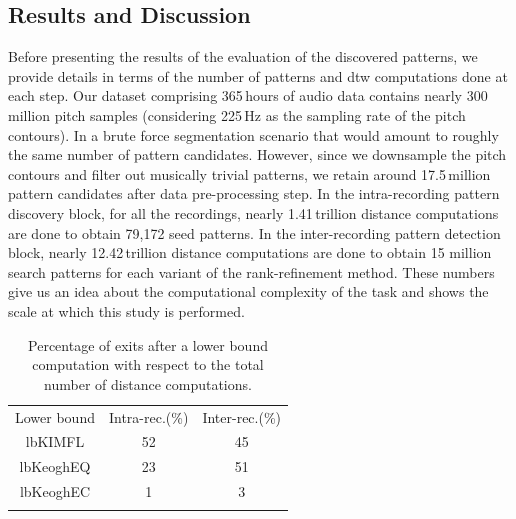 \subsection{Results and Discussion}
\label{sec:patterns_discovery_results}

Before presenting the results of the evaluation of the discovered patterns, we provide details in terms of the number of patterns and \gls{dtw} computations done at each step. Our dataset comprising 365\,hours of audio data contains nearly 300\,million pitch samples (considering 225\,Hz as the sampling rate of the pitch contours). In a brute force segmentation scenario that would amount to roughly the same number of pattern candidates. However, since we downsample the pitch contours and filter out musically trivial patterns, we retain around 17.5\,million pattern candidates after data pre-processing step. In the intra-recording pattern discovery block, for all the recordings, nearly 1.41\,trillion distance computations are done to obtain 79,172 seed patterns. In the inter-recording pattern detection block, nearly 12.42\,trillion distance computations are done to obtain 15 million search patterns for each variant of the rank-refinement method. These numbers give us an idea about the computational complexity of the task and shows the scale at which this study is performed.

\begin{table} 
	\begin{centering}
		\begin{tabular}{ c | c c }
			\tabletop
			Lower bound   	& Intra-rec.(\%)		&	Inter-rec.(\%) \\	
			\tablemid
			\acrshort{lbKIMFL}   	& 52	&	45 \\	
			\acrshort{lbKeoghEQ}   	& 23	&	51 \\
			\acrshort{lbKeoghEC}   		& 1	&	3 \\
			\tablebot
		\end{tabular}
		\caption[Percentage of exits after different lower bound computations]{Percentage of exits after a lower bound computation with respect to the total number of distance computations.}
		\label{tab:computationalStats}	
		\par \end{centering}	
\end{table}

